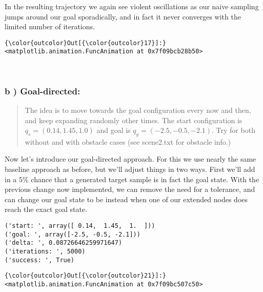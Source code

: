 \documentclass{article}
\begin{document}
    In the resulting trajectory we again see violent oscillations as our
naive sampling jumps around our goal sporadically, and in fact it never
converges with the limited number of iterations.


            \begin{Verbatim}[commandchars=\\\{\}]
{\color{outcolor}Out[{\color{outcolor}17}]:} <matplotlib.animation.FuncAnimation at 0x7f09bcb28b50>
\end{Verbatim}
        
    \begin{center}
    \end{center}
    { \hspace*{\fill} \\}
    

    \subsubsection{b ) Goal-directed:}


    \begin{quote}
The idea is to move towards the goal configuration every now and then,
and keep expanding randomly other times. The start configuration is
$q_s = (0.14, 1.45, 1.0)$ and goal is $q_g = (− 2.5, − 0.5, − 2.1 )$.
Try for both without and with obstacle cases (see scene2.txt for
obstacle info.)
\end{quote}

    Now let's introduce our goal-directed approach. For this we use nearly
the same baseline approach as before, but we'll adjust things in two
ways. First we'll add in a $5\%$ chance that a generated target sample
is in fact the goal state. With the previous change now implemented, we
can remove the need for a tolerance, and can change our goal state to be
instead when one of our extended nodes does reach the exact goal state.



    \begin{Verbatim}[commandchars=\\\{\}]
('start: ', array([ 0.14,  1.45,  1.  ]))
('goal: ', array([-2.5, -0.5, -2.1]))
('delta: ', 0.08726646259971647)
('iterations: ', 5000)
('success: ', True)
    \end{Verbatim}



            \begin{Verbatim}[commandchars=\\\{\}]
{\color{outcolor}Out[{\color{outcolor}21}]:} <matplotlib.animation.FuncAnimation at 0x7f09bc507c50>
\end{Verbatim}
        
\end{document}
